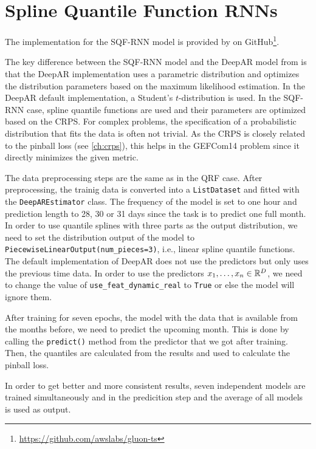 \section{Spline Quantile Function RNNs}
\label{sec:implementation-sqf-rnn}

The implementation for the SQF-RNN model is provided by 
\Textcite{Gasthaus2019} on GitHub\footnote{\url{https://github.com/awslabs/gluon-ts}}.

The key difference between the SQF-RNN model and the DeepAR model from 
\Textcite{Salinas2017} is that the DeepAR implementation uses a 
parametric distribution and optimizes the distribution parameters 
based on the maximum likelihood estimation. 
In the DeepAR default implementation, a Student's \(t\)-distribution is used. 
In the SQF-RNN case, spline quantile functions are used and their parameters 
are optimized based on the CRPS. 
For complex problems, the specification of a probabilistic distribution 
that fits the data is often not trivial. 
As the CRPS is closely related to the pinball loss (see \ref{ch:crps}), 
this helps in the GEFCom14 problem since it directly minimizes the given metric.

The data preprocessing steps are the same as in the QRF case. 
After preprocessing, the trainig data is converted into a \texttt{ListDataset} and fitted with the 
\texttt{DeepAREstimator} class. The frequency of the model is set to one hour and 
prediction length to 28, 30 or 31 days since the task is to predict one full month. 
In order to use quantile splines with three parts as the output distribution, 
we need to set the distribution output of the model to \texttt{PiecewiseLinearOutput(num\_pieces=3)}, 
i.e., linear spline quantile functions. 
The default implementation of DeepAR does not use the predictors but only uses the previous time data. 
In order to use the predictors \(x_1, \ldots, x_n \in \mathbb{R}^D\), 
we need to change the value of \texttt{use\_feat\_dynamic\_real}
to \texttt{True} or else the model will ignore them. 

After training for seven epochs, the model with the data that is available from the months before, 
we need to predict the upcoming month. This is done by calling the \texttt{predict()} 
method from the predictor that we got after training.
Then, the quantiles are calculated from the results and used to 
calculate the pinball loss.

In order to get better and more consistent results, 
seven independent models are trained simultaneously and in the predicition step 
and the average of all models is used as output.

